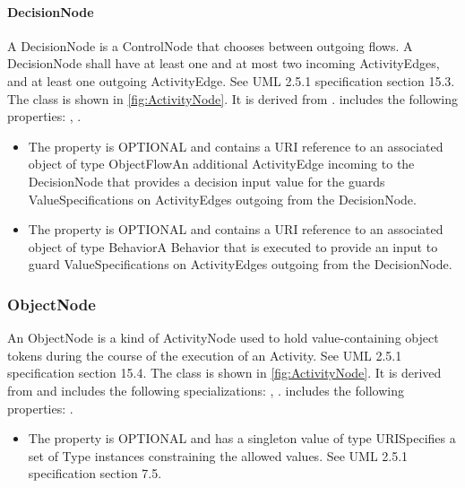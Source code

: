 \paragraph{DecisionNode}%
\label{sec:uml:DecisionNode}%
A DecisionNode is a ControlNode that chooses between outgoing flows. A DecisionNode shall have at least one and at most two incoming ActivityEdges, and at least one outgoing ActivityEdge. See UML 2.5.1 specification section 15.3.%
\linebreak%
\linebreak%
The  class is shown in \ref{fig:ActivityNode}. It is derived from .%
 includes the following properties: , . %
\begin{itemize}%
\item%
The  property is OPTIONAL and contains a URI reference to an associated object of type ObjectFlowAn additional ActivityEdge incoming to the DecisionNode that provides a decision input value for the guards ValueSpecifications on ActivityEdges outgoing from the DecisionNode.%
\item%
The  property is OPTIONAL and contains a URI reference to an associated object of type BehaviorA Behavior that is executed to provide an input to guard ValueSpecifications on ActivityEdges outgoing from the DecisionNode.%
\end{itemize}%
\subsubsection{ObjectNode}%
\label{sec:uml:ObjectNode}%
An ObjectNode is a kind of ActivityNode used to hold value-containing object tokens during the course of the execution of an Activity. See UML 2.5.1 specification section 15.4.%
\linebreak%
\linebreak%
The  class is shown in \ref{fig:ActivityNode}. It is derived from  and includes the following specializations: , . %
 includes the following properties: . %
\begin{itemize}%
\item%
The  property is OPTIONAL and has a singleton value of type URISpecifies a set of Type instances constraining the allowed values. See UML 2.5.1 specification section 7.5.%
\end{itemize}%
